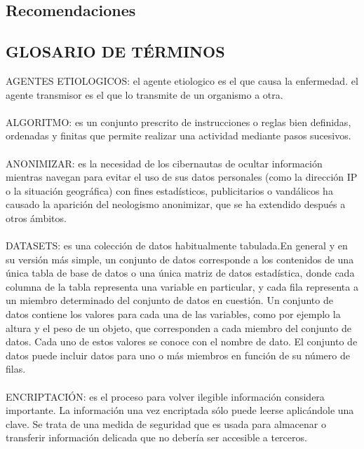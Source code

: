 \documentclass[a4paper,openright,12pt]{book}
\theoremstyle{definition}
\theoremstyle{remark}
\begin{document}
\section{Recomendaciones}

\clearpage

\begin{center}
 \chapter{GLOSARIO DE TÉRMINOS}\label{cap.glosario}
\end{center}
AGENTES ETIOLOGICOS: el agente etiologico es el que causa la enfermedad. el agente transmisor es el que lo transmite de un organismo a otra.\\\\
ALGORITMO: es un conjunto prescrito de instrucciones o reglas bien definidas, ordenadas y finitas que permite realizar una actividad mediante pasos sucesivos. \\\\
ANONIMIZAR: es la necesidad de los cibernautas de ocultar información mientras navegan para evitar el uso de sus datos personales (como la dirección IP o la situación geográfica) con fines estadísticos, publicitarios o vandálicos ha causado la aparición del neologismo anonimizar, que se ha extendido después a otros ámbitos.  \\\\
DATASETS: es una colección de datos habitualmente tabulada.En general y en su versión más simple, un conjunto de datos corresponde a los contenidos de una única tabla de base de datos o una única matriz de datos estadística, donde cada columna de la tabla representa una variable en particular, y cada fila representa a un miembro determinado del conjunto de datos en cuestión. Un conjunto de datos contiene los valores para cada una de las variables, como por ejemplo la altura y el peso de un objeto, que corresponden a cada miembro del conjunto de datos. Cada uno de estos valores se conoce con el nombre de dato. El conjunto de datos puede incluir datos para uno o más miembros en función de su número de filas.\\\\
ENCRIPTACIÓN: es el proceso para volver ilegible información considera importante. La información una vez encriptada sólo puede leerse aplicándole una clave. Se trata de una medida de seguridad que es usada para almacenar o transferir información delicada que no debería ser accesible a terceros.\\\\
\end{document}
